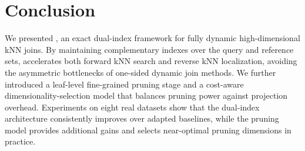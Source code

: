 \section{Conclusion}\label{sec:conclusion}
We presented \dualtree, an exact dual-index framework for fully dynamic high-dimensional kNN joins. By maintaining complementary indexes over the query and reference sets, \dualtree accelerates both forward kNN search and reverse kNN localization, avoiding the asymmetric bottlenecks of one-sided dynamic join methods. We further introduced a leaf-level fine-grained pruning stage and a cost-aware dimensionality-selection model that balances pruning power against projection overhead. Experiments on eight real datasets show that the dual-index architecture consistently improves over adapted baselines, while the pruning model provides additional gains and selects near-optimal pruning dimensions in practice.
\appendix
